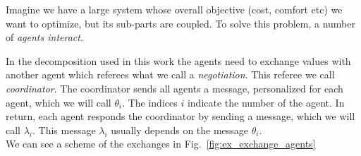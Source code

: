 \documentclass[../main.tex]{subfiles}
\begin{document}
\begin{example}\label{ex:qualitative_example}
  Imagine we have a large system whose overall objective (cost, comfort etc) we want to optimize, but its sub-parts are coupled.
  To solve this problem, a number of \emph{agents interact}.

  In the decomposition used in this work the agents need to exchange values with another agent which referees what we call a \emph{negotiation}. This referee we call \emph{coordinator}.
  The coordinator sends all agents a message, personalized for each agent, which we will call $\theta_{i}$. The indices $i$ indicate the number of the agent.
  In return, each agent responds the coordinator by sending a message, which we will call $\lambda_{i}$.
  This message $\lambda_{i}$ usually depends on the message $\theta_{i}$.\\
  We can see a scheme of the exchanges in Fig.~\ref{fig:ex_exchange_agents}


  \begin{figure}[H]
    \centering
\end{figure}
\end{example}
\end{document}
